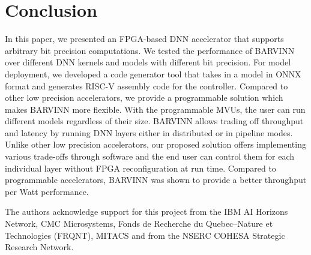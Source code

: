\documentclass[sigconf]{acmart}
\newcommand{\MVU}{MVU}
\newcommand{\BARVINN}{BARVINN}
\begin{document}
    
\section{Conclusion}
\label{sec:conclusion}
In this paper, we presented an FPGA-based DNN accelerator that supports arbitrary bit precision computations. We tested the performance of \BARVINN{} over different DNN kernels and models with different bit precision. For model deployment, we developed a code generator tool that takes in a model in ONNX format and generates RISC-V assembly code for the controller. Compared to other low precision accelerators, we provide a programmable solution which makes \BARVINN{} more flexible.  With the programmable \MVU s, the user can run different models regardless of their size. \BARVINN{} allows trading off throughput and latency by running DNN layers either in distributed or in pipeline modes. Unlike other low precision accelerators, our proposed solution offers implementing various trade-offs through software and the end user can control them for each individual layer without FPGA reconfiguration at run time. Compared to programmable accelerators, \BARVINN{} was shown to provide a better throughput per Watt performance. 





\begin{acks}
The authors acknowledge support for this project from the IBM AI Horizons Network, CMC Microsystems, Fonds de Recherche du Quebec–Nature et Technologies (FRQNT), MITACS and from the NSERC COHESA Strategic Research Network.

\end{acks}
\end{document}
